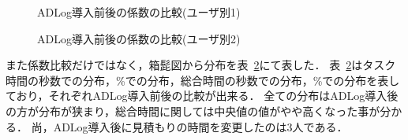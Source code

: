 \begin{figure}[hb]
	\begin{center}
		\caption{ADLog導入前後の係数の比較(ユーザ別1)}
		\label{fig:8}
	\end{center}
\end{figure}
\begin{figure}[hb]
	\begin{center}
		\caption{ADLog導入前後の係数の比較(ユーザ別2)}
		\label{fig:9}
	\end{center}
\end{figure}

また係数比較だけではなく，箱髭図から分布を表~\ref{fig:9}にて表した．
表~\ref{fig:9}はタスク時間の秒数での分布，\%での分布，総合時間の秒数での分布，\%での分布を表しており，それぞれADLog導入前後の比較が出来る．
全ての分布はADLog導入後の方が分布が狭まり，総合時間に関しては中央値の値がやや高くなった事が分かる．
尚，ADLog導入後に見積もりの時間を変更したのは3人である．

